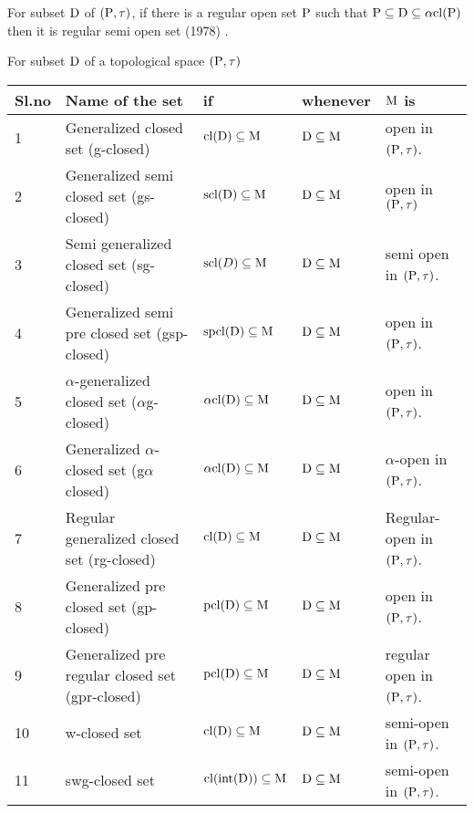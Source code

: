 \begin{dfn}\label{dfn1.2.6}
For subset $\mathrm{D}$ of $(\mathrm{P}, \tau)$, if there is a regular open set $\mathrm{P}$ such that $\mathrm{P} \subseteq \mathrm{D} \subseteq \alpha \mathrm{cl}(\mathrm{P})$ then it is regular semi open set (1978) \cite{Cameron}. 
\end{dfn}

\begin{dfn}\label{dfn1.2.7}
For subset $\mathrm{D}$ of a topological space $(\mathrm{P}, \tau)$ 
\end{dfn}

{\fontsize{10}{12}\selectfont
\begin{longtable}{@{}|p{.9cm}|>{\raggedright}p{5cm}|>{\centering}p{2.5cm}|>{\centering}p{1.7cm}|>{\centering}p{2.8cm}|@{}}
\hline
\textbf{Sl.no} & \textbf{Name of the set} & \textbf{if} & \textbf{whenever} & {\boldmath $\mathrm{M}$} \textbf{is}\tabularnewline
\hline
1 & Generalized closed set (g-closed) \cite{Levine} & $\mathrm{cl}(\mathrm{D}) \subseteq \mathrm{M}$ & $\mathrm{D} \subseteq \mathrm{M}$ & open in $(\mathrm{P}, \tau)$.\tabularnewline
\hline
2 & Generalized semi closed set (gs-closed) \cite{Arya} & $\mathrm{scl}(\mathrm{D}) \subseteq \mathrm{M}$ & $\mathrm{D} \subseteq \mathrm{M}$ & open in $(\mathrm{P}, \tau)$\tabularnewline
\hline
3 & Semi generalized closed set (sg-closed) \cite{Bhattacharya1} & $\mathrm{scl}(D) \subseteq \mathrm{M}$ & $\mathrm{D} \subseteq \mathrm{M}$ & semi open in $(\mathrm{P}, \tau)$.\tabularnewline
\hline
4 & Generalized semi pre closed set (gsp-closed) \cite{Dontchev} & $\mathrm{spcl}(\mathrm{D}) \subseteq \mathrm{M}$ & $\mathrm{D} \subseteq \mathrm{M}$ & open in $(\mathrm{P}, \tau)$.\tabularnewline
\hline
5 & $\alpha$-generalized closed set ($\alpha$g-closed) \cite{Maki3} & $\alpha\mathrm{cl}(\mathrm{D}) \subseteq \mathrm{M}$ & $\mathrm{D}\subseteq\mathrm{M}$ & open in $(\mathrm{P}, \tau)$.\tabularnewline
\hline
6 & Generalized $\alpha$-closed set (g$\alpha$ closed) \cite{Maki3} & $\alpha\mathrm{cl}(\mathrm{D}) \subseteq \mathrm{M}$ & $\mathrm{D}\subseteq\mathrm{M}$ & $\alpha$-open in $(\mathrm{P}, \tau)$.\tabularnewline
\hline
7 & Regular generalized closed set (rg-closed) \cite{Palaniappan} & $\mathrm{cl}(\mathrm{D}) \subseteq \mathrm{M}$ & $\mathrm{D} \subseteq \mathrm{M}$ & Regular-open in $(\mathrm{P}, \tau)$.\tabularnewline
\hline
8 & Generalized pre closed set (gp-closed) \cite{Noiri1} & $\mathrm{pcl}(\mathrm{D}) \subseteq \mathrm{M}$ & $\mathrm{D} \subseteq \mathrm{M}$ & open in $(\mathrm{P}, \tau)$.\tabularnewline
\hline
9 & Generalized pre regular closed set (gpr-closed) \cite{Gnanambal} & $\mathrm{pcl}(\mathrm{D}) \subseteq \mathrm{M}$ & $\mathrm{D} \subseteq \mathrm{M}$ & regular open in $(\mathrm{P}, \tau)$.\tabularnewline
\hline
10 & w-closed set \cite{Sheik} & $\mathrm{cl}(\mathrm{D}) \subseteq \mathrm{M}$ & $\mathrm{D} \subseteq \mathrm{M}$ & semi-open in $(\mathrm{P}, \tau)$.\tabularnewline
\hline
11 & swg-closed set \cite{Nagaveni6} & $\mathrm{cl}(\mbox{int}(\mathrm{D})) \subseteq \mathrm{M}$ & $\mathrm{D} \subseteq \mathrm{M}$ & semi-open in $(\mathrm{P}, \tau)$.\tabularnewline

\end{longtable}}
